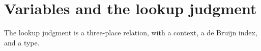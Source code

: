 \begin{fence}
\begin{code}%
\>[0]\AgdaSpace{}%
\AgdaSpace{}%
\AgdaSymbol{:}\AgdaSpace{}%
\AgdaSpace{}%
\<%
\\
\>[0][@{}l@{\AgdaIndent{0}}]%
\>[2]%
\>[6]\AgdaSymbol{:}\AgdaSpace{}%
\<%
\\
%
\>[2]\AgdaOperator{\AgdaInductiveConstructor{\AgdaUnderscore{},\AgdaUnderscore{}}}\AgdaSpace{}%
\AgdaSymbol{:}\AgdaSpace{}%
\AgdaSpace{}%
\AgdaSpace{}%
\AgdaSpace{}%
\AgdaSpace{}%
\<%
\end{code}
\end{fence}

\hypertarget{variables-and-the-lookup-judgment}{%
\section{Variables and the lookup
judgment}\label{variables-and-the-lookup-judgment}}

The lookup judgment is a three-place relation, with a context, a de
Bruijn index, and a type.


